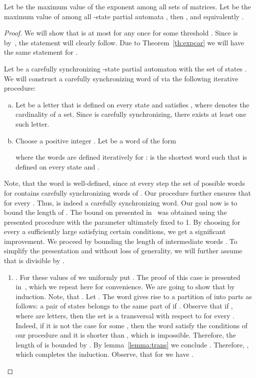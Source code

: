\documentclass[a4paper,USenglish]{lipics}
\theoremstyle{definition}
\begin{document}
\begin{theorem}
\label{th:newBound}
Let  be the maximum value of the exponent among all sets of  matrices. Let  be the maximum value of  among all -state partial automata , then , and equivalently .
\end{theorem}
\begin{proof}
We will show that  is at most  for any  once  for some threshold . Since  is  by~\cite{Mart2010}, the statement  will clearly follow. Due to Theorem~\ref{th:expcar} we will have the same statement for .






Let  be a carefully synchronizing -state partial automaton with the set of states .
We will construct a carefully synchronizing word  of  via the following iterative procedure:
\begin{enumerate}[(a)]
\item Let  be a letter that is defined on every state  and satisfies , where  denotes the cardinality of a set. Since  is carefully synchronizing, there exists at least one such letter.
\item Choose a positive integer . Let  be a word of the form 

where the words  are defined iteratively for :  is the shortest word such that  is defined on every state and . 
\end{enumerate}
Note, that the word  is well-defined, since at every step the set of possible words for  contains carefully synchronizing words of . Our procedure further ensures that  for every . Thus,  is indeed a carefully synchronizing word. Our goal now is to bound the length of .
The bound on  presented in~\cite{Ivan2009} was obtained using the presented procedure with the parameter  ultimately fixed to 1. By choosing for every  a sufficiently large  satisfying certain conditions, we get a significant improvement. We proceed by bounding the length of intermediate words . To simplify the presentation and without loss of generality, we will further assume that  is divisible by .
\begin{enumerate}
\item . For these values of  we uniformly put . The proof of this case is presented in~\cite[Proposition 7]{Ivan2009}, which we repeat here for convenience.
We are going to show that  by induction. Note, that . Let .
The word  gives rise to a partition  of  into  parts as follows: a pair of states  belongs to the same part of  if . Observe that if , where  are letters, then the set  is a transversal with respect to  for every . Indeed, if it is not the case for some , then the word  satisfy the conditions  of our procedure and it is shorter than , which is impossible. Therefore, the length of  is bounded by . By lemma~\ref{lemma:trans} we conclude . Therefore, , which completes the induction. Observe, that for  we have .


\end{enumerate}
\end{proof}
\end{document}
